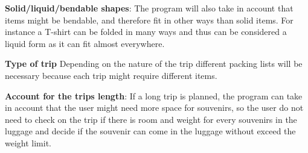 \textbf{Solid/liquid/bendable shapes}:
The program will also take in account that items might be bendable, and therefore fit in other ways than solid items. For instance a T-shirt can be folded in many ways and thus can be considered a liquid form as it can fit almost everywhere.
\newline

\textbf{Type of trip}
Depending on the nature of the trip different packing lists will be necessary because each trip might require different items.
\newline

\textbf{Account for the trips length}:
If a long trip is planned, the program can take in account that the user might need more space for souvenirs, so the user do not need to check on the trip if there is room and weight for every souvenirs in the luggage and decide if the souvenir can come in the luggage without exceed the weight limit.
\newline